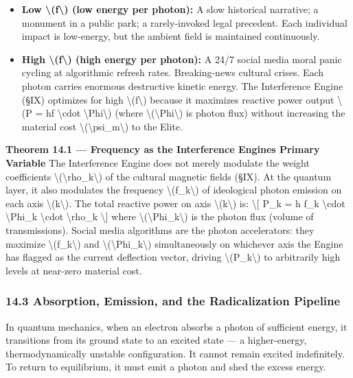 {\begin{itemize}
\tightlist
\item
  \textbf{Low \textbackslash(f\textbackslash) (low energy per photon):}
  A slow historical narrative; a monument in a public park; a
  rarely-invoked legal precedent. Each individual impact is low-energy,
  but the ambient field is maintained continuously.
\item
  \textbf{High \textbackslash(f\textbackslash) (high energy per
  photon):} A 24/7 social media moral panic cycling at algorithmic
  refresh rates. Breaking-news cultural crises. Each photon carries
  enormous destructive kinetic energy. The Interference Engine (§IX)
  optimizes for high \textbackslash(f\textbackslash) because it
  maximizes reactive power output \textbackslash(P = hf
  \textbackslash cdot \textbackslash Phi\textbackslash) (where
  \textbackslash(\textbackslash Phi\textbackslash) is photon flux)
  without increasing the material cost
  \textbackslash(\textbackslash psi\_m\textbackslash) to the Elite.
\end{itemize}

\textbf{Theorem 14.1 --- Frequency as the Interference
Engine\textquotesingle s Primary Variable} The Interference Engine does
not merely modulate the weight coefficients
\textbackslash(\textbackslash rho\_k\textbackslash) of the cultural
magnetic fields (§IX). At the quantum layer, it also modulates the
frequency \textbackslash(f\_k\textbackslash) of ideological photon
emission on each axis \textbackslash(k\textbackslash). The total
reactive power on axis \textbackslash(k\textbackslash) is:
\textbackslash{[} P\_k = h f\_k \textbackslash cdot
\textbackslash Phi\_k \textbackslash cdot \textbackslash rho\_k
\textbackslash{]} where
\textbackslash(\textbackslash Phi\_k\textbackslash) is the photon flux
(volume of transmissions). Social media algorithms are the photon
accelerators: they maximize \textbackslash(f\_k\textbackslash) and
\textbackslash(\textbackslash Phi\_k\textbackslash) simultaneously on
whichever axis the Engine has flagged as the current deflection vector,
driving \textbackslash(P\_k\textbackslash) to arbitrarily high levels at
near-zero material cost.

\subsubsection{14.3 Absorption, Emission, and the Radicalization
Pipeline}\label{absorption-emission-and-the-radicalization-pipeline}

In quantum mechanics, when an electron absorbs a photon of sufficient
energy, it transitions from its ground state to an excited state --- a
higher-energy, thermodynamically unstable configuration. It cannot
remain excited indefinitely. To return to equilibrium, it must emit a
photon and shed the excess energy.

}
